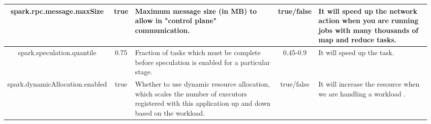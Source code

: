 \begin{table*}[!htbp]
\begin{center}
\begin{tabular}{ | c | c  | p{4cm} | c | p{5cm} |}
  \hline
    spark.rpc.message.maxSize & true & Maximum message size (in MB) to allow in "control plane" communication. & true/false & It will speed up the network action when  you are running jobs with many thousands of map and reduce tasks.\\
  \hline
    spark.speculation.quantile &  0.75 & Fraction of tasks which must be complete before speculation is enabled for a particular stage. & 0.45-0.9 & It will speed up the task.\\
  \hline
     spark.dynamicAllocation.enabled &  true & Whether to use dynamic resource allocation, which scales the number of executors registered with this application up and down based on the workload. & true/false & It will increase the resource when we are handling a workload .\\
   \hline    
    \end{tabular}
\end{center}	
\end{table*}




